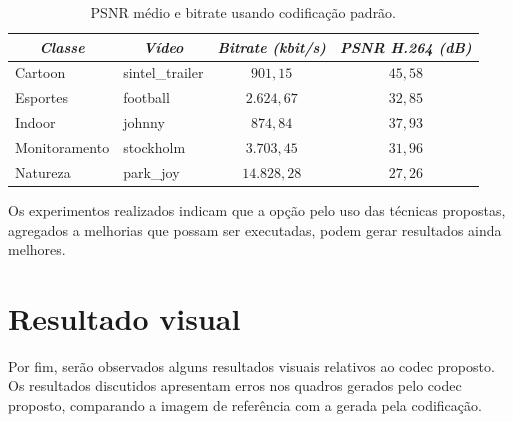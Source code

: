 \documentclass[cic,tc]{iiufrgs}
\begin{document}
\begin{table}[h]
    \caption{PSNR médio e bitrate usando codificação padrão.}
    \centering
        \begin{tabular}{|l|l|c|c|}
          \hline
          \multicolumn{1}{|c}{\textit{Classe}} & 
          \multicolumn{1}{|c}{\textit{Vídeo}} & 
          \multicolumn{1}{|c|}{\textit{Bitrate (kbit/s)}} &
          \multicolumn{1}{|c|}{\textit{PSNR H.264 (dB)}} \\
          \hline
          \hline
          Cartoon & sintel\_trailer & $901,15$ & $45,58$ \\
          Esportes & football & $2.624,67$ & $32,85$ \\
          Indoor & johnny & $874,84$ & $37,93$ \\
          Monitoramento & stockholm & $3.703,45$ & $31,96$ \\
          Natureza & park\_joy & $14.828,28$ & $27,26$ \\
          \hline
        \end{tabular}
    \label{tbl:bitrateonlyh264}
\end{table}

Os experimentos realizados indicam que a opção pelo uso das técnicas propostas,
agregados a melhorias que possam ser executadas, podem gerar resultados ainda melhores.

\section{Resultado visual}
\label{sec:resultadovisual}
Por fim, serão observados alguns resultados visuais relativos 
ao codec proposto.
Os resultados discutidos apresentam erros nos quadros gerados 
pelo codec proposto,
comparando a imagem de referência com a gerada pela codificação.
\end{document}
